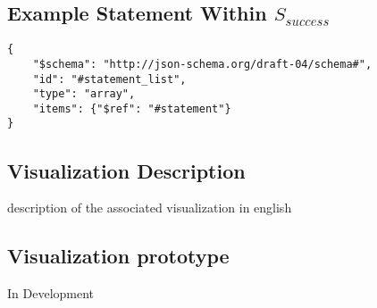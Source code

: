 \documentclass{article}
\begin{document}
  \subsection{Example Statement Within $S_{success}$}
\begin{lstlisting}[style=json]
{
    "$schema": "http://json-schema.org/draft-04/schema#",
    "id": "#statement_list",
    "type": "array",
    "items": {"$ref": "#statement"}
}
\end{lstlisting}
  \subsection{Visualization Description}

  description of the associated visualization in english
  \subsection{Visualization prototype}
  In Development
\end{document}
